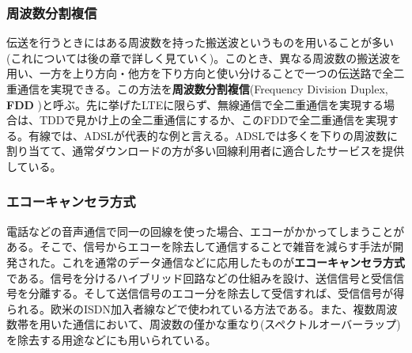 \subsubsection{周波数分割複信}
伝送を行うときにはある周波数を持った搬送波というものを用いることが多い(これについては後の章で詳しく見ていく)。このとき、異なる周波数の搬送波を用い、一方を上り方向・他方を下り方向と使い分けることで一つの伝送路で全二重通信を実現できる。この方法を\textbf{周波数分割複信}(Frequency Division Duplex, \textbf{FDD} )と呼ぶ。先に挙げたLTEに限らず、無線通信で全二重通信を実現する場合は、TDDで見かけ上の全二重通信にするか、このFDDで全二重通信を実現する。有線では、ADSLが代表的な例と言える。ADSLでは多くを下りの周波数に割り当てて、通常ダウンロードの方が多い回線利用者に適合したサービスを提供している。

\subsubsection{エコーキャンセラ方式}
電話などの音声通信で同一の回線を使った場合、エコーがかかってしまうことがある。そこで、信号からエコーを除去して通信することで雑音を減らす手法が開発された。これを通常のデータ通信などに応用したものが\textbf{エコーキャンセラ方式}である。信号を分けるハイブリッド回路などの仕組みを設け、送信信号と受信信号を分離する。そして送信信号のエコー分を除去して受信すれば、受信信号が得られる。欧米のISDN加入者線などで使われている方法である。また、複数周波数帯を用いた通信において、周波数の僅かな重なり(スペクトルオーバーラップ)を除去する用途などにも用いられている。

